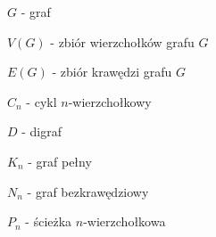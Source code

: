 $G$ - graf

$V(G)$ - zbiór wierzchołków grafu $G$

$E(G)$ - zbiór krawędzi grafu $G$

$C_n$ - cykl $n$-wierzchołkowy

$D$ - digraf

$K_n$ - graf pełny

$N_n$ - graf bezkrawędziowy

$P_n$ - ścieżka $n$-wierzchołkowa

